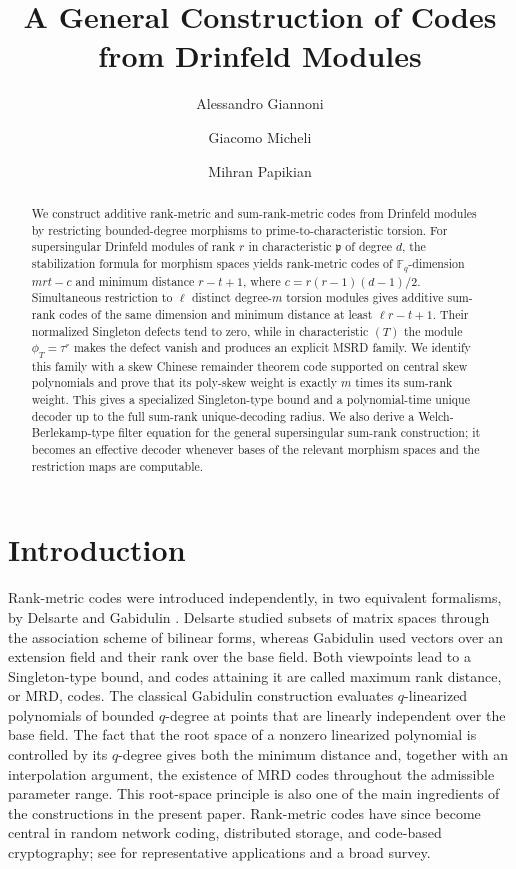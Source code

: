 \documentclass[10pt,a4paper]{amsart}
\title{A General Construction of Codes from Drinfeld Modules}
\author[A. Giannoni]{Alessandro Giannoni}
\author[G. Micheli]{Giacomo Micheli}
\author[M. Papikian]{Mihran Papikian}
\theoremstyle{definition}
\theoremstyle{plain}
\theoremstyle{remark}
\newcommand{\vF}{\mathbb F}
\begin{document}
\begin{abstract}
We construct additive rank-metric and sum-rank-metric codes from Drinfeld
modules by restricting bounded-degree morphisms to prime-to-characteristic
torsion. For supersingular Drinfeld modules of rank $r$ in characteristic
$\mathfrak p$ of degree $d$, the stabilization formula for morphism spaces
yields rank-metric codes of $\vF_q$-dimension $mrt-c$ and minimum distance
$r-t+1$, where $c=r(r-1)(d-1)/2$. Simultaneous restriction to $\ell$
distinct degree-$m$ torsion modules gives additive sum-rank codes of the same
dimension and minimum distance at least $\ell r-t+1$. Their normalized
Singleton defects tend to zero, while in characteristic $(T)$ the module
$\phi_T=\tau^r$ makes the defect vanish and produces an explicit MSRD family.
We identify this family with a skew Chinese remainder theorem code supported
on central skew polynomials and prove that its poly-skew weight is exactly
$m$ times its sum-rank weight. This gives a specialized Singleton-type bound
and a polynomial-time unique decoder up to the full sum-rank unique-decoding
radius. We also derive a Welch-Berlekamp-type filter equation for the general
supersingular sum-rank construction; it becomes an effective decoder whenever
bases of the relevant morphism spaces and the restriction maps are
computable.
\end{abstract}

\maketitle

\section{Introduction}

Rank-metric codes were introduced independently, in two equivalent
formalisms, by Delsarte and Gabidulin \cite{Del78,Gab85}.  Delsarte studied
subsets of matrix spaces through the association scheme of bilinear forms,
whereas Gabidulin used vectors over an extension field and their rank over the
base field.  Both viewpoints lead to a Singleton-type bound, and codes
attaining it are called maximum rank distance, or MRD, codes.  The classical
Gabidulin construction evaluates $q$-linearized polynomials of bounded
$q$-degree at points that are linearly independent over the base field.  The
fact that the root space of a nonzero linearized polynomial is controlled by
its $q$-degree gives both the minimum distance and, together with an
interpolation argument, the existence of MRD codes throughout the admissible
parameter range.  This root-space principle is also one of the main
ingredients of the constructions in the present paper.  Rank-metric codes
have since become central in random network coding, distributed storage, and
code-based cryptography; see \cite{SKK08,BartzEtAl22} for representative
applications and a broad survey.
\end{document}

